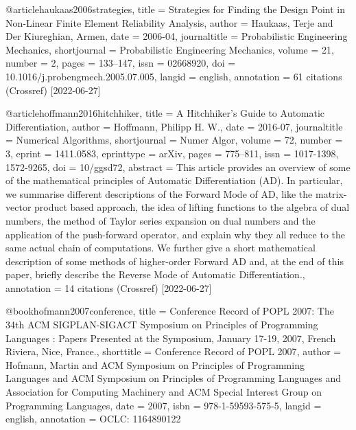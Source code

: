@article{haukaas2006strategies,
  title = {Strategies for Finding the Design Point in Non-Linear Finite Element Reliability Analysis},
  author = {Haukaas, Terje and Der Kiureghian, Armen},
  date = {2006-04},
  journaltitle = {Probabilistic Engineering Mechanics},
  shortjournal = {Probabilistic Engineering Mechanics},
  volume = {21},
  number = {2},
  pages = {133--147},
  issn = {02668920},
  doi = {10.1016/j.probengmech.2005.07.005},
  langid = {english},
  annotation = {61 citations (Crossref) [2022-06-27]}
}

@article{hoffmann2016hitchhiker,
  title = {A {{Hitchhiker}}'s {{Guide}} to {{Automatic Differentiation}}},
  author = {Hoffmann, Philipp H. W.},
  date = {2016-07},
  journaltitle = {Numerical Algorithms},
  shortjournal = {Numer Algor},
  volume = {72},
  number = {3},
  eprint = {1411.0583},
  eprinttype = {arXiv},
  pages = {775--811},
  issn = {1017-1398, 1572-9265},
  doi = {10/ggsd72},
  abstract = {This article provides an overview of some of the mathematical principles of Automatic Differentiation (AD). In particular, we summarise different descriptions of the Forward Mode of AD, like the matrix-vector product based approach, the idea of lifting functions to the algebra of dual numbers, the method of Taylor series expansion on dual numbers and the application of the push-forward operator, and explain why they all reduce to the same actual chain of computations. We further give a short mathematical description of some methods of higher-order Forward AD and, at the end of this paper, briefly describe the Reverse Mode of Automatic Differentiation.},
  annotation = {14 citations (Crossref) [2022-06-27]}
}

@book{hofmann2007conference,
  title = {Conference Record of {{POPL}} 2007: The 34th {{ACM SIGPLAN-SIGACT Symposium}} on {{Principles}} of {{Programming Languages}} : Papers Presented at the {{Symposium}}, {{January}} 17-19, 2007, {{French Riviera}}, {{Nice}}, {{France}}.},
  shorttitle = {Conference Record of {{POPL}} 2007},
  author = {Hofmann, Martin and {ACM Symposium on Principles of Programming Languages} and {ACM Symposium on Principles of Programming Languages} and {Association for Computing Machinery} and {ACM Special Interest Group on Programming Languages}},
  date = {2007},
  isbn = {978-1-59593-575-5},
  langid = {english},
  annotation = {OCLC: 1164890122}
}

